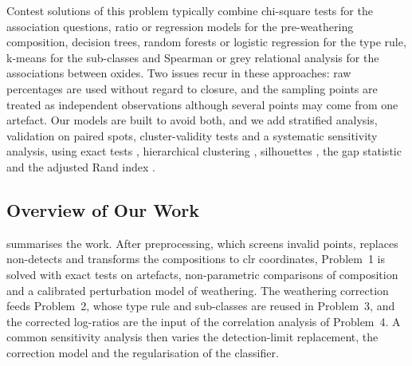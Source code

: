 \documentclass[11pt,a4paper]{article}
\begin{document}
Contest solutions of this problem typically combine chi-square tests for the association questions, ratio or regression models for the pre-weathering composition, decision trees, random forests or logistic regression for the type rule, k-means for the sub-classes and Spearman or grey relational analysis for the associations between oxides.
Two issues recur in these approaches: raw percentages are used without regard to closure, and the sampling points are treated as independent observations although several points may come from one artefact.
Our models are built to avoid both, and we add stratified analysis, validation on paired spots, cluster-validity tests and a systematic sensitivity analysis, using exact tests \citep{agresti2002}, hierarchical clustering \citep{ward1963}, silhouettes \citep{rousseeuw1987}, the gap statistic \citep{tibshirani2001} and the adjusted Rand index \citep{hubert1985}.

\subsection{Overview of Our Work}
 summarises the work.
After preprocessing, which screens invalid points, replaces non-detects and transforms the compositions to clr coordinates, Problem~1 is solved with exact tests on artefacts, non-parametric comparisons of composition and a calibrated perturbation model of weathering.
The weathering correction feeds Problem~2, whose type rule and sub-classes are reused in Problem~3, and the corrected log-ratios are the input of the correlation analysis of Problem~4.
A common sensitivity analysis then varies the detection-limit replacement, the correction model and the regularisation of the classifier.
\end{document}
